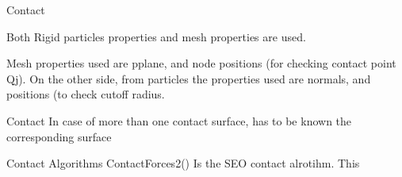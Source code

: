 

Contact

Both Rigid particles properties and mesh properties are used.

Mesh properties used are pplane, and node positions (for checking contact point Qj). On the other side, from particles the properties used are normals, and positions (to check cutoff radius.


Contact
In case of more than one contact surface, has to be known the corresponding surface

Contact Algorithms
ContactForces2()
Is the SEO contact alrotihm. This 